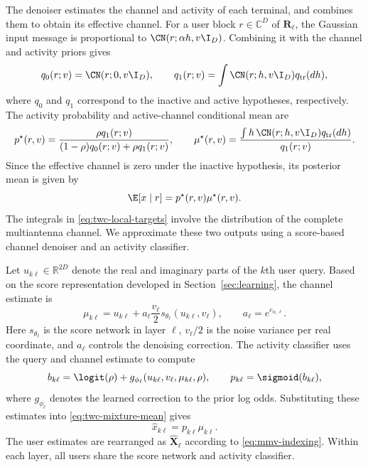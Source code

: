 The denoiser estimates the channel and activity of each terminal,
and combines them to obtain its effective channel.
For a user block $r\in\mathbb C^D$ of $\mathbf R_\ell$, the Gaussian
input message is proportional to $\CN(r;\alpha h,v\I_D)$.
Combining it with the channel and activity priors gives
\begin{equation}
 q_0(r;v)=\CN(r;0,v\I_D),\qquad
 q_1(r;v)=\int\CN(r;h,v\I_D)q_{\rm tr}(dh),
 \label{eq:twc-local-densities}
\end{equation}
where $q_0$ and $q_1$ correspond to the inactive and active
hypotheses, respectively. The activity probability and active-channel
conditional mean are
\begin{equation}
 p^\star(r,v)=\frac{\rho q_1(r;v)}
                   {(1-\rho)q_0(r;v)+\rho q_1(r;v)},\qquad
 \mu^\star(r,v)=\frac{\int h\,\CN(r;h,v\I_D)q_{\rm tr}(dh)}{q_1(r;v)}.
 \label{eq:twc-local-targets}
\end{equation}
Since the effective channel is zero under the inactive hypothesis,
its posterior mean is given by \cite[eq.~(35)]{cai2026}
\begin{equation}
 \E[x\mid r]=p^\star(r,v)\mu^\star(r,v).
 \label{eq:twc-mixture-mean}
\end{equation}
The integrals in \eqref{eq:twc-local-targets} involve the distribution
of the complete multiantenna channel. We approximate these two outputs
using a score-based channel denoiser and an activity classifier.

Let $u_{k\ell}\in\mathbb R^{2D}$ denote the real and imaginary parts
of the $k$th user query. Based on the score representation developed
in Section~\ref{sec:learning}, the channel estimate is
\begin{equation}
 \mu_{k\ell}=u_{k\ell}
       +a_\ell\frac{v_\ell}{2}s_{\theta_\ell}(u_{k\ell},v_\ell),
 \qquad a_\ell=e^{c_{\alpha,\ell}}.
 \label{eq:twc-conditional-mean}
\end{equation}
Here $s_{\theta_\ell}$ is the score network in layer $\ell$,
$v_\ell/2$ is the noise variance per real coordinate, and $a_\ell$
controls the denoising correction. The activity classifier uses the
query and channel estimate to compute
\begin{equation}
 b_{k\ell}=\logit(\rho)+
 g_{\phi_\ell}(u_{k\ell},v_\ell,\mu_{k\ell},\rho),\qquad
 p_{k\ell}=\sigmoid(b_{k\ell}),
 \label{eq:twc-activity}
\end{equation}
where $g_{\phi_\ell}$ denotes the learned correction to the prior
log odds. Substituting these estimates into
\eqref{eq:twc-mixture-mean} gives
\begin{equation}
 \widehat x_{k\ell}=p_{k\ell}\mu_{k\ell}.
 \label{eq:twc-estimate}
\end{equation}
The user estimates are rearranged as $\widehat{\mathbf X}_\ell$
according to \eqref{eq:mmv-indexing}. Within each layer, all users
share the score network and activity classifier.

